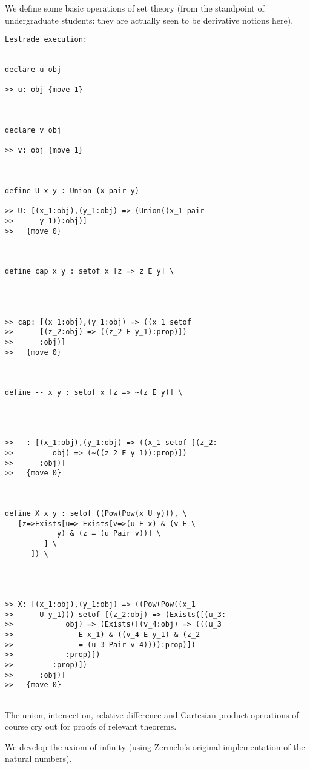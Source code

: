 \documentclass{article}
\begin{document}
We define some basic operations of set theory (from the standpoint of undergraduate students:  they are actually seen to be derivative notions here).

\begin{verbatim}Lestrade execution:


declare u obj

>> u: obj {move 1}



declare v obj

>> v: obj {move 1}



define U x y : Union (x pair y)

>> U: [(x_1:obj),(y_1:obj) => (Union((x_1 pair
>>      y_1)):obj)]
>>   {move 0}



define cap x y : setof x [z => z E y] \
   



>> cap: [(x_1:obj),(y_1:obj) => ((x_1 setof
>>      [(z_2:obj) => ((z_2 E y_1):prop)])
>>      :obj)]
>>   {move 0}



define -- x y : setof x [z => ~(z E y)] \
   



>> --: [(x_1:obj),(y_1:obj) => ((x_1 setof [(z_2:
>>         obj) => (~((z_2 E y_1)):prop)])
>>      :obj)]
>>   {move 0}



define X x y : setof ((Pow(Pow(x U y))), \
   [z=>Exists[u=> Exists[v=>(u E x) & (v E \
            y) & (z = (u Pair v))] \
         ] \
      ]) \
   



>> X: [(x_1:obj),(y_1:obj) => ((Pow(Pow((x_1
>>      U y_1))) setof [(z_2:obj) => (Exists([(u_3:
>>            obj) => (Exists([(v_4:obj) => (((u_3
>>               E x_1) & ((v_4 E y_1) & (z_2
>>               = (u_3 Pair v_4)))):prop)])
>>            :prop)])
>>         :prop)])
>>      :obj)]
>>   {move 0}


\end{verbatim}

The union, intersection, relative difference and Cartesian product operations of course cry out for proofs of relevant theorems. 

We develop the axiom of infinity (using Zermelo's original implementation of the natural numbers).
\end{document}
